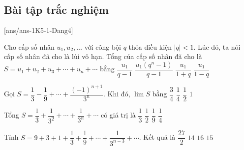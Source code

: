 \subsection*{Bài tập trắc nghiệm}
[ans/ans-1K5-1-Dang4]
\begin{ex}%
	Cho cấp số nhân $u_1,u_2,\ldots$ với công bội $q$ thỏa điều kiện $|q|<1$. Lúc đó, ta nói cấp số nhân đã cho là lùi vô hạn. Tổng của cấp số nhân đã cho là $S=u_1+u_2+u_3+\cdots +u_n+\cdots$ bằng 
	\choice
	{$\dfrac{u_1}{q-1}$}
	{$\dfrac{u_1\left(q^n-1\right)}{q-1}$}
	{$\dfrac{u_1}{1+q}$}
	{\True $\dfrac{u_1}{1-q}$}
\end{ex}
\begin{ex}%
	Gọi $S=\dfrac{1}{3}-\dfrac{1}{9}+\cdots +\dfrac{(-1)^{n+1}}{3^n}$. Khi đó, $\lim S$ bằng 
	\choice
	{$\dfrac{3}{4}$}
	{\True $\dfrac{1}{4}$}
	{$\dfrac{1}{2}$}
	{$1$}
\end{ex}
\begin{ex}%
	Tổng $S=\dfrac{1}{3}+\dfrac{1}{3^2}+\cdots +\dfrac{1}{3^n}+\cdots$ có giá trị là 
	\choice
	{$\dfrac{1}{3}$}
	{\True $\dfrac{1}{2}$}
	{$\dfrac{1}{9}$}
	{$\dfrac{1}{4}$}
\end{ex}
\begin{ex}%
	Tính $S=9+3+1+\dfrac{1}{3}+\dfrac{1}{9}+\cdots +\dfrac{1}{3^{n-3}}+\cdots$. Kết quả là 
	\choice
	{\True $\dfrac{27}{2}$}
	{$14$}
	{$16$}
	{$15$}
\end{ex}
